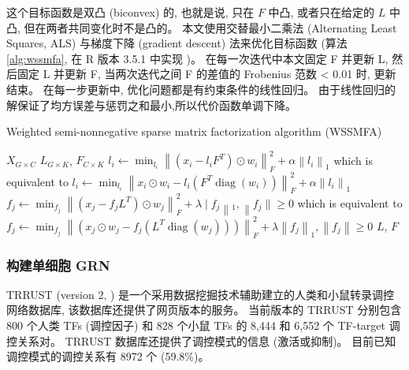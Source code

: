 这个目标函数是双凸 (biconvex) 的, 也就是说, 只在 $F$ 中凸, 或者只在给定的 $L$ 中凸, 但在两者共同变化时不是凸的。
本文使用交替最小二乘法 (Alternating Least Squares, ALS) 与梯度下降 (gradient descent) 法来优化目标函数 (算法 \ref{alg:wssmfa}, 
在 R 版本 3.5.1 中实现 )。
在每一次迭代中本文固定 F 并更新 L, 然后固定 L 并更新 F, 当两次迭代之间 F 的差值的 Frobenius 范数 < 0.01 时, 更新结束。
在每一步更新中, 优化问题都是有约束条件的线性回归。
由于线性回归的解保证了均方误差与惩罚之和最小,所以代价函数单调下降。
\begin{algorithm}
    \caption{Weighted semi-nonnegative sparse matrix factorization algorithm (WSSMFA)}
    \label{alg:wssmfa}
    \begin{algorithmic}[1]
    \Require  $X_{G \times C}$                                   
    \Ensure $L_{G \times K}$, $F_{C \times K}$                
                \State $l_{i} \leftarrow \min _{l_{i}}\left\|\left(x_{i}-l_{i} F^{T}\right) \odot w_{i}\right\|_{F}^{2}+\alpha\left\|l_{i}\right\|_{1}$
                \State which is equivalent to 
                \State $l_{i} \leftarrow \min _{l_{i}}\left\|x_{i} \odot w_{i}-l_{i}\left(F^{T} \operatorname{diag}\left(w_{i}\right)\right)\right\|_{F}^{2}+\alpha\left\|l_{i}\right\|_{1}$
            \EndFor
                \State $f_{j} \leftarrow \min _{f_{j}}\left\|\left(x_{j}-f_{j} L^{T}\right) \odot w_{j}\right\|_{F}^{2}+\lambda \mid f_{j}\left\|_{1},\right\| f_{j} \| \geq 0$
                \State which is equivalent to 
                \State $f_{j} \leftarrow \min _{f_{j}}\left\|\left(x_{j} \odot w_{j}-f_{j}\left(L^{T} \operatorname{diag}\left(w_{j}\right)\right)\right)\right\|_{F}^{2}+\lambda\left\|f_{j}\right\|_{1},\left\|f_{j}\right\| \geq 0$
            \EndFor
        \EndWhile  
        \State \Return $L$, $F$        
  \end{algorithmic}
\end{algorithm}

\subsubsection{构建单细胞 GRN}
TRRUST (version 2, ) 是一个采用数据挖掘技术辅助建立的人类和小鼠转录调控网络数据库,
该数据库还提供了网页版本的服务。
当前版本的 TRRUST 分别包含 800 个人类 TFs (调控因子) 和 828 个小鼠 TFs 的 8,444 和 6,552 个 TF-target 调控关系对。
TRRUST 数据库还提供了调控模式的信息 (激活或抑制)。
目前已知调控模式的调控关系有 8972 个 (59.8\%)。

